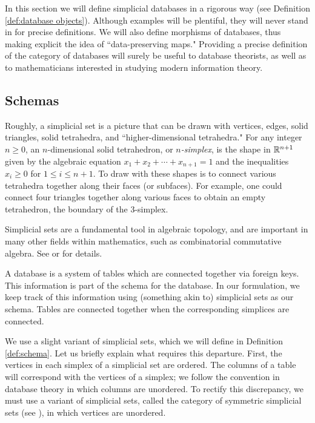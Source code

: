 \documentclass{amsart}
\begin{document}
In this section we will define simplicial databases in a rigorous way (see Definition \ref{def:database objects}).  Although examples will be plentiful, they will never stand in for precise definitions.  We will also define morphisms of databases, thus making explicit the idea of ``data-preserving maps."  Providing a precise definition of the category of databases will surely be useful to database theorists, as well as to mathematicians interested in studying modern information theory.

\subsection{Schemas}\label{subsec:schemas}

Roughly, a simplicial set is a picture that can be drawn with vertices, edges, solid triangles, solid tetrahedra, and ``higher-dimensional tetrahedra."  For any integer $n\geq 0$, an $n$-dimensional solid tetrahedron, or {\em $n$-simplex}, is the shape in ${\mathbb R}^{n+1}$ given by the algebraic equation $x_1+x_2+\cdots+x_{n+1}=1$ and the inequalities $x_i\geq 0$ for $1\leq i\leq n+1$.  To draw with these shapes is to connect various tetrahedra together along their faces (or subfaces).  For example, one could connect four triangles together along various faces to obtain an empty tetrahedron, the boundary of the 3-simplex.

Simplicial sets are a fundamental tool in algebraic topology, and are important in many other fields within mathematics, such as combinatorial commutative algebra.   See \cite{Fri} or \cite{GJ} for details.

A database is a system of tables which are connected together via foreign keys.  This information is part of the schema for the database.  In our formulation, we keep track of this information using (something akin to) simplicial sets as our schema.  Tables are connected together when the corresponding simplices are connected.  

We use a slight variant of simplicial sets, which we will define in Definition \ref{def:schema}.  Let us briefly explain what requires this departure.  First, the vertices in each simplex of a simplicial set are ordered.  The columns of a table will correspond with the vertices of a simplex; we follow the convention in database theory in which columns are unordered.  To rectify this discrepancy, we must use a variant of simplicial sets, called the category of symmetric simplicial sets (see \cite{Gra}), in which vertices are unordered.
\end{document}
